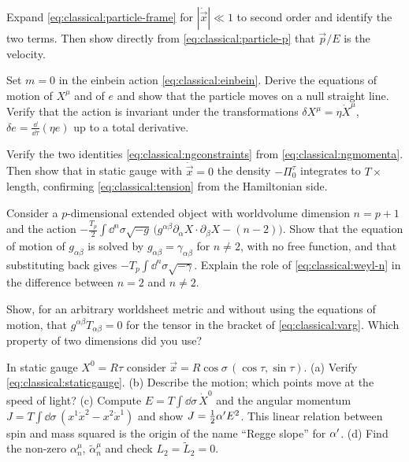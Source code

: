 \begin{exercise}[$\star$]
Expand \eqref{eq:classical:particle-frame} for $|\dot{\vec x}|\ll1$ to second order and identify
the two terms. Then show directly from \eqref{eq:classical:particle-p} that $\vec p/E$ is the
velocity.
\end{exercise}

\begin{exercise}[$\star$]
Set $m=0$ in the einbein action \eqref{eq:classical:einbein}. Derive the equations of motion
of $X^\mu$ and of $e$ and show that the particle moves on a null straight line. Verify that
the action is invariant under the transformations $\delta X^\mu=\eta\dot X^\mu$,
$\delta e=\frac{\dd}{\dd\tau}(\eta e)$ up to a total derivative.
\end{exercise}

\begin{exercise}[$\star$]
Verify the two identities \eqref{eq:classical:ngconstraints} from
\eqref{eq:classical:ngmomenta}. Then show that in static gauge with $\dot{\vec x}=0$ the density
$-\Pi^\tau_0$ integrates to $T\times$ length, confirming \eqref{eq:classical:tension} from the
Hamiltonian side.
\end{exercise}

\begin{exercise}[$\star\star$]
Consider a $p$-dimensional extended object with worldvolume dimension $n=p+1$ and the action
$-\frac{T_p}{2}\int\dd^n\sigma\sqrt{-g}\,\big(g^{\alpha\beta}\partial_\alpha X\cdot\partial_\beta
X-(n-2)\big)$. Show that the equation of motion of $g_{\alpha\beta}$ is solved by
$g_{\alpha\beta}=\gamma_{\alpha\beta}$ for $n\neq2$, with no free function, and that
substituting back gives $-T_p\int\dd^n\sigma\sqrt{-\gamma}$. Explain the role of
\eqref{eq:classical:weyl-n} in the difference between $n=2$ and $n\neq2$.
\end{exercise}

\begin{exercise}[$\star\star$]\label{exr:classical:trace}
Show, for an arbitrary worldsheet metric and without using the equations of motion, that
$g^{\alpha\beta}T_{\alpha\beta}=0$ for the tensor in the bracket of \eqref{eq:classical:varg}.
Which property of two dimensions did you use?
\end{exercise}

\begin{exercise}
In static gauge $X^0=R\tau$ consider $\vec x=R\cos\sigma\,(\cos\tau,\sin\tau)$. (a) Verify
\eqref{eq:classical:staticgauge}. (b) Describe the motion; which points move at the speed of
light? (c) Compute $E=T\int\dd\sigma\,\dot X^0$ and the angular momentum
$J=T\int\dd\sigma\,(x^1\dot x^2-x^2\dot x^1)$ and show $J=\tfrac12\alpha' E^2$. This linear
relation between spin and mass squared is the origin of the name ``Regge slope'' for $\alpha'$.
(d) Find the non-zero $\alpha_n^\mu$, $\tilde\alpha_n^\mu$ and check $L_2=\tilde L_2=0$.
\end{exercise}

